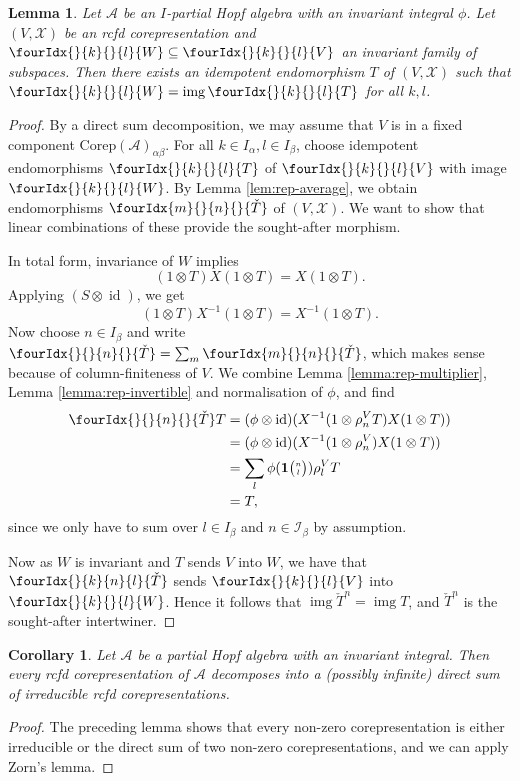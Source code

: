 \documentclass[11pt]{article}
\DeclareMathOperator{\id}{id}
\DeclareMathOperator{\img}{img}
\newcommand{\Corep}{\mathrm{Corep}}
\newcommand{\Grt}[3]{#1{\tiny {\begin{pmatrix} #2\\#3\end{pmatrix}}}}
\newcommand{\UnitC}[2]{\Grt{\mathbf{1}}{#1}{#2}}
\newcommand{\Gr}[5]{\fourIdx{#2}{#4}{#3}{#5}{#1}}%
\newcommand{\Gru}[3]{\Gr{#1}{}{}{#2}{#3}}
\newcommand{\Grd}[3]{\Gr{#1}{#2}{#3}{}{}}
\newtheorem{Lem}[Theorem]{Lemma}
\newtheorem{Cor}[Theorem]{Corollary}
\theoremstyle{definition}
\numberwithin{equation}{section}
\begin{document}
\begin{Lem}
  Let $\mathscr{A}$ be an $I$-partial Hopf algebra with an invariant integral $\phi$.
  Let $(V,\mathscr{X})$ be an rcfd corepresentation
  and $\Gru{W}{k}{l} \subseteq \Gru{V}{k}{l}$ an invariant family of
  subspaces. Then there exists an idempotent endomorphism $T$ of
  $(V,\mathscr{X})$ such that $\Gru{W}{k}{l}=\img\Gru{T}{k}{l}$ for
  all $k,l$.
\end{Lem}
\begin{proof}
By a direct sum decomposition, we may assume that $V$ is in a fixed component $\Corep(\mathscr{A})_{\alpha\beta}$. For all $k\in I_{\alpha},l\in I_{\beta}$, choose idempotent endomorphisms $\Gru{T}{k}{l}$ of $\Gru{V}{k}{l}$
  with image $\Gru{W}{k}{l}$. By Lemma \ref{lem:rep-average}, we obtain
  endomorphisms $\Grd{\check{T}}{m}{n}$ of $(V,\mathscr{X})$. We want to show
  that linear combinations of these provide the sought-after morphism.
  
    In
  total form, invariance of $W$ implies  \[(1 \otimes T)X(1
  \otimes T)=X(1\otimes T).\] Applying
 $(S \otimes \id)$, we get   \[(1 \otimes T)X^{-1}(1
  \otimes T)=X^{-1}(1\otimes T).\]
Now choose $n\in I_{\beta}$ and write $\Grd{\check{T}}{}{n} = \sum_m \Grd{\check{T}}{m}{n}$, which makes sense because of column-finiteness of $V$. We combine  Lemma
  \ref{lemma:rep-multiplier}, Lemma \ref{lemma:rep-invertible} and
  normalisation of $\phi$, and find
  \begin{align*}
    \Grd{\check{T}}{}{n} T &= (\phi \otimes \id)(X^{-1}(1 \otimes
    \rho_{n}^{V}T)X(1 \otimes T)) \\  &= 
     (\phi \otimes \id)(X^{-1}(1 \otimes
    \rho_{n}^{V})X(1 \otimes T)) \\
    &=
  \sum_l \phi(\UnitC{n}{l}) \rho^{V}_{l}T \\& =T,
  \end{align*}
 since we only have to sum over $l\in I_{\beta}$ and $n\in \mathscr{I}_{\beta}$ by assumption. 
 
 Now as $W$ is invariant and $T$ sends $V$ into $W$, we have that $\Gr{\check{T}}{}{n}{k}{l}$ sends $\Gru{V}{k}{l}$ into $\Gru{W}{k}{l}$. Hence it follows that $\img{\check{T}^{n}}=\img T$, and $\check{T}^{n}$ is the sought-after intertwiner.
\end{proof}

\begin{Cor}  \label{cor:rep-cosemisimple}%
  Let $\mathscr{A}$ be a partial Hopf algebra with an invariant integral.  Then
  every rcfd corepresentation of $\mathscr{A}$ decomposes into a (possibly infinite) direct
  sum of irreducible rcfd corepresentations.
\end{Cor} 
\begin{proof} 
The preceding lemma shows that  every non-zero corepresentation is either
irreducible or the direct sum of two non-zero corepresentations, and we can apply Zorn's lemma.
\end{proof}
\end{document}
